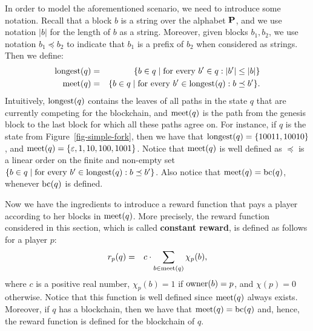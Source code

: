 In order to model the aforementioned scenario, we need to introduce some notation.
Recall that a block $b$ is a string over the alphabet $\mathbf{P}$, and we use notation $|b|$ for the length of $b$ as a string. Moreover, given blocks $b_1, b_2$, we use notation $b_1 \preceq b_2$ to indicate that $b_1$ is a prefix of $b_2$ when considered as strings. Then we define: 
\begin{eqnarray*}
{\text{\rm longest}}(q) & = & \{ b \in q \mid \text{for every } b' \in q: |b'| \leq |b|\}\\
\text{\rm meet}(q) & = & \{b \in q \mid \text{for every } b' \in {\text{\rm longest}}(q): b \preceq b'\}.
\end{eqnarray*}
Intuitively, ${\text{\rm longest}}(q)$ contains the leaves of all paths in the state $q$ that are currently competing for the blockchain, and $\text{\rm meet}(q)$ is the path from the genesis block to the last block for which all these paths agree on. For instance, if $q$ is the state from Figure~\ref{fig-simple-fork}, then we have that ${\text{\rm longest}}(q)=\{10011,10010\}$, and $\text{\rm meet}(q)=\{\varepsilon, 1, 10, 100, 1001\}$. Notice that $\text{\rm meet}(q)$ is well defined as $\preceq$ is a linear order on the finite and non-empty set $\{b \in q \mid \text{for every } b' \in {\text{\rm longest}}(q): b \preceq b'\}$. Also notice that $\text{\rm meet}(q)=\text{bc}(q)$, whenever $\text{bc}(q)$ is defined.

Now we have the ingredients to introduce a reward function that pays a player according to her blocks
 in $\text{\rm meet}(q)$. More precisely, the reward function considered in this section, which is called \textbf{constant reward}, is defined as follows 
for a player $p$:
\begin{eqnarray*}
r_p(q) & = & 
{\displaystyle c \cdot \sum_{b \in \text{\rm meet}(q)} \chi_p(b),}
\end{eqnarray*}
where $c$ is a positive real number, $\chi_p(b) = 1$ if $\text{\rm owner}(b) = p$, and $\chi(p) = 0$ otherwise.
Notice that this function is well defined since $\text{\rm meet}(q)$ always exists. Moreover, if $q$ has a blockchain, then we have that $\text{\rm meet}(q) = \text{bc}(q)$ and, hence, the reward function is defined for the blockchain of $q$.
 
